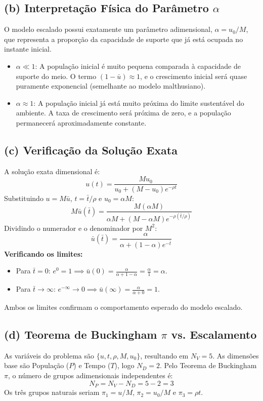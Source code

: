 \documentclass{article}
\begin{document}
\subsection*{(b) Interpretação Física do Parâmetro $\alpha$}
O modelo escalado possui exatamente um parâmetro adimensional, $\alpha = u_0/M$, que representa a proporção da capacidade de suporte que já está ocupada no instante inicial.
\begin{itemize}
    \item $\alpha \ll 1$: A população inicial é muito pequena comparada à capacidade de suporte do meio. O termo $(1-\bar{u}) \approx 1$, e o crescimento inicial será quase puramente exponencial (semelhante ao modelo malthusiano).
    \item $\alpha \approx 1$: A população inicial já está muito próxima do limite sustentável do ambiente. A taxa de crescimento será próxima de zero, e a população permanecerá aproximadamente constante.
\end{itemize}

\subsection*{(c) Verificação da Solução Exata}
A solução exata dimensional é:
\[ u(t) = \frac{M u_0}{u_0 + (M - u_0)e^{-\rho t}} \]
Substituindo $u = M\bar{u}$, $t = \bar{t}/\rho$ e $u_0 = \alpha M$:
\[ M\bar{u}(\bar{t}) = \frac{M (\alpha M)}{\alpha M + (M - \alpha M)e^{-\rho(\bar{t}/\rho)}} \]
Dividindo o numerador e o denominador por $M^2$:
\[ \bar{u}(\bar{t}) = \frac{\alpha}{\alpha + (1 - \alpha)e^{-\bar{t}}} \]
\textbf{Verificando os limites:}
\begin{itemize}
    \item Para $\bar{t} = 0$: $e^0 = 1 \implies \bar{u}(0) = \frac{\alpha}{\alpha + 1 - \alpha} = \frac{\alpha}{1} = \alpha$.
    \item Para $\bar{t} \to \infty$: $e^{-\infty} \to 0 \implies \bar{u}(\infty) = \frac{\alpha}{\alpha + 0} = 1$.
\end{itemize}
Ambos os limites confirmam o comportamento esperado do modelo escalado.

\subsection*{(d) Teorema de Buckingham $\pi$ vs. Escalamento}
As variáveis do problema são $\{u, t, \rho, M, u_0\}$, resultando em $N_V = 5$. As dimensões base são População ($P$) e Tempo ($T$), logo $N_D = 2$.
Pelo Teorema de Buckingham $\pi$, o número de grupos adimensionais independentes é:
\[ N_P = N_V - N_D = 5 - 2 = 3 \]
Os três grupos naturais seriam $\pi_1 = u/M$, $\pi_2 = u_0/M$ e $\pi_3 = \rho t$.
\end{document}
